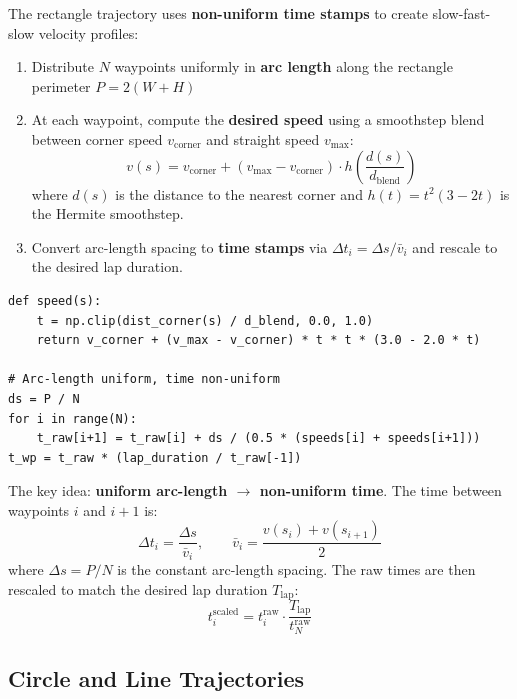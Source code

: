 \documentclass[11pt,a4paper]{article}
\begin{document}
The rectangle trajectory uses \textbf{non-uniform time stamps} to create slow-fast-slow velocity profiles:

\begin{enumerate}[leftmargin=2em]
    \item Distribute $N$ waypoints uniformly in \textbf{arc length} along the rectangle perimeter $P = 2(W + H)$
    \item At each waypoint, compute the \textbf{desired speed} using a smoothstep blend between corner speed $v_{\mathrm{corner}}$ and straight speed $v_{\mathrm{max}}$:
    \begin{equation}
        v(s) = v_{\mathrm{corner}} + (v_{\mathrm{max}} - v_{\mathrm{corner}}) \cdot h\!\left(\frac{d(s)}{d_{\mathrm{blend}}}\right)
    \end{equation}
    where $d(s)$ is the distance to the nearest corner and $h(t) = t^2(3 - 2t)$ is the Hermite smoothstep.
    \item Convert arc-length spacing to \textbf{time stamps} via $\Delta t_i = \Delta s / \bar{v}_i$ and rescale to the desired lap duration.
\end{enumerate}

\begin{lstlisting}[caption={Velocity profiling for rectangle corners --- \texttt{rl/trajectory.py}}]
def speed(s):
    t = np.clip(dist_corner(s) / d_blend, 0.0, 1.0)
    return v_corner + (v_max - v_corner) * t * t * (3.0 - 2.0 * t)

# Arc-length uniform, time non-uniform
ds = P / N
for i in range(N):
    t_raw[i+1] = t_raw[i] + ds / (0.5 * (speeds[i] + speeds[i+1]))
t_wp = t_raw * (lap_duration / t_raw[-1])
\end{lstlisting}

\begin{codemath}
The key idea: \textbf{uniform arc-length $\to$ non-uniform time}. The time between waypoints $i$ and $i+1$ is:
\[
    \Delta t_i = \frac{\Delta s}{\bar{v}_i}, \qquad \bar{v}_i = \frac{v(s_i) + v(s_{i+1})}{2}
\]
where $\Delta s = P/N$ is the constant arc-length spacing. The raw times are then rescaled to match the desired lap duration $T_{\mathrm{lap}}$:
\[
    t_i^{\mathrm{scaled}} = t_i^{\mathrm{raw}} \cdot \frac{T_{\mathrm{lap}}}{t_N^{\mathrm{raw}}}
\]
\end{codemath}

\subsection{Circle and Line Trajectories}
\end{document}
